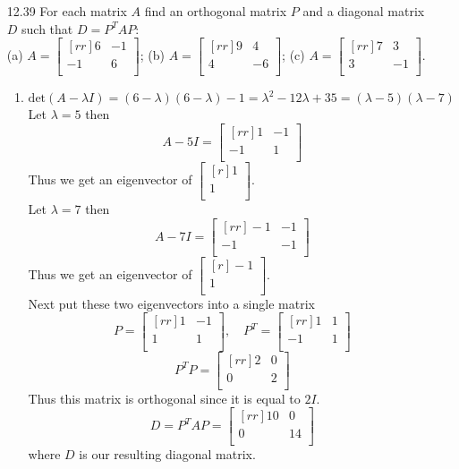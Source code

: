 \documentclass[12pt]{article}
\theoremstyle{plain}
\theoremstyle{definition}
\theoremstyle{plain}
\begin{document}
\begin{enumerate}
\item[12.39]For each matrix $A$ find an orthogonal matrix $P$ and a diagonal matrix $D$ such that $D=P^TAP$:\\
(a) $A=\begin{bmatrix}[rr]6&-1\\-1&6\\\end{bmatrix}$; (b) $A=\begin{bmatrix}[rr]9&4\\4&-6\\\end{bmatrix}$; (c) $A=\begin{bmatrix}[rr]7&3\\3&-1\\\end{bmatrix}$.
	\begin{enumerate}
	\item
		\[ \mathrm{det}(A-\lambda I) = (6-\lambda)(6-\lambda) - 1 = \lambda^2 - 12\lambda + 35  = (\lambda-5)(\lambda-7) \]
		Let $\lambda=5$ then
		\[ A-5I = \begin{bmatrix}[rr]1&-1\\-1&1\\\end{bmatrix} \]
		Thus we get an eigenvector of $\begin{bmatrix}[r]1\\1\\\end{bmatrix}$.\\
		Let $\lambda=7$ then
		\[ A-7I=\begin{bmatrix}[rr]-1&-1\\-1&-1\\\end{bmatrix} \]
		Thus we get an eigenvector of $\begin{bmatrix}[r]-1\\1\\\end{bmatrix}$.\\
		Next put these two eigenvectors into a single matrix
		\[ P=\begin{bmatrix}[rr]1&-1\\1&1\\\end{bmatrix}, \quad P^T = \begin{bmatrix}[rr]1&1\\-1&1\\\end{bmatrix} \]
		\[ P^TP = \begin{bmatrix}[rr]2&0\\0&2\\\end{bmatrix} \]
		Thus this matrix is orthogonal since it is equal to $2I$.
		\[ D=P^TAP = \begin{bmatrix}[rr]10&0\\0&14\\\end{bmatrix} \]
		where $D$ is our resulting diagonal matrix.
		

\end{enumerate}
\end{enumerate}
\end{document}

